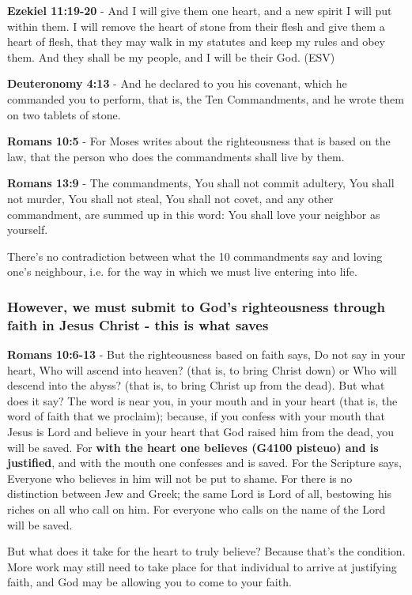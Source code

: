 \documentclass[11pt]{article}
\begin{document}
\textbf{Ezekiel 11:19-20} - And I will give them one heart, and a new spirit I will put within them. I will remove the heart of stone from their flesh and give them a heart of flesh, that they may walk in my statutes and keep my rules and obey them. And they shall be my people, and I will be their God. (ESV)

\textbf{Deuteronomy 4:13} - And he declared to you his covenant, which he commanded you to perform, that is, the Ten Commandments, and he wrote them on two tablets of stone.

\textbf{Romans 10:5} - For Moses writes about the righteousness that is based on the law, that the person who does the commandments shall live by them.

\textbf{Romans 13:9} - The commandments, You shall not commit adultery, You shall not murder, You shall not steal, You shall not covet, and any other commandment, are summed up in this word: You shall love your neighbor as yourself.

There's no contradiction between what the 10 commandments say and loving one's neighbour, i.e. for the way in which we must live entering into life.

\subsubsection{However, we must submit to God's righteousness through faith in Jesus Christ - this is what saves}
\label{sec:orgb233f69}
\textbf{Romans 10:6-13} - But the righteousness based on faith says, Do not say in your heart, Who will ascend into heaven? (that is, to bring Christ down) or Who will descend into the abyss? (that is, to bring Christ up from the dead).  But what does it say? The word is near you, in your mouth and in your heart (that is, the word of faith that we proclaim); because, if you confess with your mouth that Jesus is Lord and believe in your heart that God raised him from the dead, you will be saved.  For \textbf{with the heart one believes (G4100 pisteuo) and is justified}, and with the mouth one confesses and is saved.  For the Scripture says, Everyone who believes in him will not be put to shame.  For there is no distinction between Jew and Greek; the same Lord is Lord of all, bestowing his riches on all who call on him.  For everyone who calls on the name of the Lord will be saved.

But what does it take for the heart to truly believe? Because that's the condition.
More work may still need to take place for that individual to arrive at justifying faith, and God may be allowing you to come to your faith.
\end{document}

